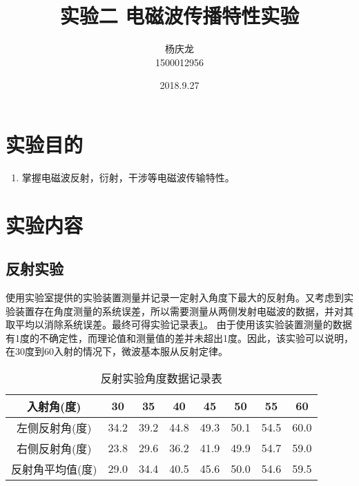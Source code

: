 \documentclass{article}
\begin{document}

\begin{CJK}{UTF8}{gkai}
\title{实验二 电磁波传播特性实验}
\author{杨庆龙 \\1500012956}
\date{2018.9.27}
\maketitle

\section{实验目的}
\begin{enumerate}
  \item 掌握电磁波反射，衍射，干涉等电磁波传输特性。
\end{enumerate}

\section{实验内容}
\subsection{反射实验}
使用实验室提供的实验装置测量并记录一定射入角度下最大的反射角。又考虑到实验装置存在角度测量的系统误差，所以需要测量从两侧发射电磁波的数据，并对其取平均以消除系统误差。最终可得实验记录表\ref{t1.0}。
由于使用该实验装置测量的数据有1度的不确定性，而理论值和测量值的差并未超出1度。因此，该实验可以说明，在30度到60入射的情况下，微波基本服从反射定律。
\begin{table}[!htbp]
  \centering
  \caption{反射实验角度数据记录表}
  \label{t1.0}
\begin{tabular}{|c|c|c|c|c|c|c|c|}
  \hline
  入射角(度)&30&35&40&45&50&55&60\\
  \hline
  左侧反射角(度)&34.2&39.2&44.8&49.3&50.1&54.5&60.0\\
  \hline
  右侧反射角(度)&23.8&29.6&36.2&41.9&49.9&54.7&59.0\\
  \hline
  反射角平均值(度)&29.0&34.4&40.5&45.6&50.0&54.6&59.5\\
  \hline
\end{tabular}
\end{table}



\end{CJK}
\end{document}
